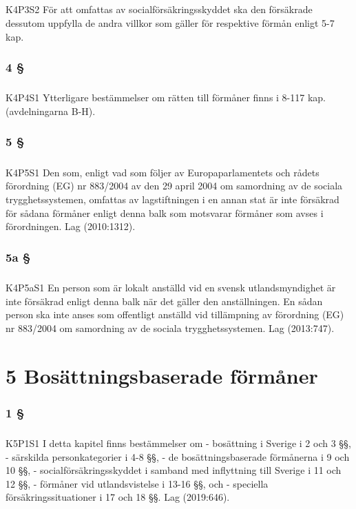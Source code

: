 \documentclass[a4paper,notitlepage,openany,10pt]{book}
\begin{document}
\paragraph*{}
{\tiny K4P3S2}
För att omfattas av socialförsäkringsskyddet ska den försäkrade dessutom uppfylla de andra villkor som gäller för respektive förmån enligt 5-7 kap.
\subsection*{4 §}
\paragraph*{}
{\tiny K4P4S1}
Ytterligare bestämmelser om rätten till förmåner finns i 8-117 kap. (avdelningarna B-H).
\subsection*{5 §}
\paragraph*{}
{\tiny K4P5S1}
Den som, enligt vad som följer av Europaparlamentets och rådets förordning (EG) nr 883/2004 av den 29 april 2004 om samordning av de sociala trygghetssystemen, omfattas av lagstiftningen i en annan stat är inte försäkrad för sådana förmåner enligt denna balk som motsvarar förmåner som avses i förordningen.
Lag (2010:1312).
\subsection*{5a §}
\paragraph*{}
{\tiny K4P5aS1}
En person som är lokalt anställd vid en svensk utlandsmyndighet är inte försäkrad enligt denna balk när det gäller den anställningen. En sådan person ska inte anses som offentligt anställd vid tillämpning av förordning (EG) nr 883/2004 om samordning av de sociala trygghetssystemen.
Lag (2013:747).
\chapter*{5 Bosättningsbaserade förmåner}
\subsection*{1 §}
\paragraph*{}
{\tiny K5P1S1}
I detta kapitel finns bestämmelser om
\newline - bosättning i Sverige i 2 och 3 §§,
\newline - särskilda personkategorier i 4-8 §§,
\newline - de bosättningsbaserade förmånerna i 9 och 10 §§,
\newline - socialförsäkringsskyddet i samband med inflyttning till Sverige i 11 och 12 §§,
\newline - förmåner vid utlandsvistelse i 13-16 §§, och
\newline - speciella försäkringssituationer i 17 och 18 §§.
Lag (2019:646).
\end{document}
